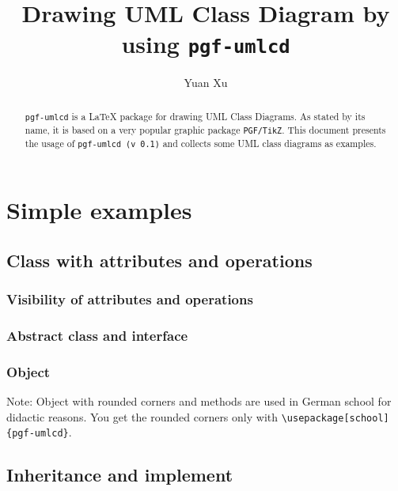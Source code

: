 \documentclass{article}
\newcommand{\demo}[2][1]{
\begin{minipage}{.49\linewidth}
\centering
\resizebox{#1\linewidth}{!}{

}
\end{minipage}
\hspace{0.01\linewidth}
\begin{minipage}{.5\linewidth}

\end{minipage}
}
\begin{document}
\title{Drawing UML Class Diagram by using \texttt{pgf-umlcd}}
\author{Yuan Xu}
\maketitle

\begin{abstract}
  \texttt{pgf-umlcd} is a LaTeX package for drawing UML Class
  Diagrams. As stated by its name, it is based on a very popular
  graphic package \texttt{PGF/TikZ}. This document presents the usage
  of \texttt{pgf-umlcd (v 0.1)} and collects some UML class diagrams as
  examples.
\end{abstract}

\tableofcontents

\section{Simple examples}
\subsection{Class with attributes and operations}
\demo{class}

\subsubsection{Visibility of attributes and operations}
\demo[0.8]{visibility}

\subsubsection{Abstract class and interface}
\demo[0.5]{abstract-class}
\demo[0.5]{interface}

\subsubsection{Object}
Note: Object with rounded corners and methods are used in German school for didactic reasons. You get the rounded corners only with \lstinline|\usepackage[school]{pgf-umlcd}|.\\
\demo[0.7]{object}
\demo[0.7]{object-include-methods}

\subsection{Inheritance and implement}
\end{document}
